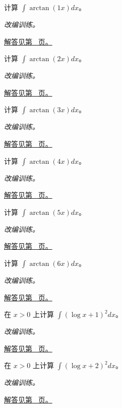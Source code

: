 \documentclass[12pt,fontset=fandol]{ctexart}
\begin{document}
\begin{example}[反三角函数的分部积分]\label{ex:c15q7}
计算 $\int\arctan(1x)dx$。
\par\textit{改编训练。}\par\hyperref[ans:c15q7]{解答见第~\pageref{ans:c15q7} 页。}
\end{example}
\begin{example}[反三角函数的分部积分]\label{ex:c15q8}
计算 $\int\arctan(2x)dx$。
\par\textit{改编训练。}\par\hyperref[ans:c15q8]{解答见第~\pageref{ans:c15q8} 页。}
\end{example}
\begin{example}[反三角函数的分部积分]\label{ex:c15q9}
计算 $\int\arctan(3x)dx$。
\par\textit{改编训练。}\par\hyperref[ans:c15q9]{解答见第~\pageref{ans:c15q9} 页。}
\end{example}
\begin{example}[反三角函数的分部积分]\label{ex:c15q10}
计算 $\int\arctan(4x)dx$。
\par\textit{改编训练。}\par\hyperref[ans:c15q10]{解答见第~\pageref{ans:c15q10} 页。}
\end{example}
\begin{example}[反三角函数的分部积分]\label{ex:c15q11}
计算 $\int\arctan(5x)dx$。
\par\textit{改编训练。}\par\hyperref[ans:c15q11]{解答见第~\pageref{ans:c15q11} 页。}
\end{example}
\begin{example}[反三角函数的分部积分]\label{ex:c15q12}
计算 $\int\arctan(6x)dx$。
\par\textit{改编训练。}\par\hyperref[ans:c15q12]{解答见第~\pageref{ans:c15q12} 页。}
\end{example}
\begin{example}[对数平方的分部积分]\label{ex:c15q13}
在 $x>0$ 上计算 $\displaystyle\int(\log x+1)^2dx$。
\par\textit{改编训练。}\par\hyperref[ans:c15q13]{解答见第~\pageref{ans:c15q13} 页。}
\end{example}
\begin{example}[对数平方的分部积分]\label{ex:c15q14}
在 $x>0$ 上计算 $\displaystyle\int(\log x+2)^2dx$。
\par\textit{改编训练。}\par\hyperref[ans:c15q14]{解答见第~\pageref{ans:c15q14} 页。}
\end{example}
\end{document}

